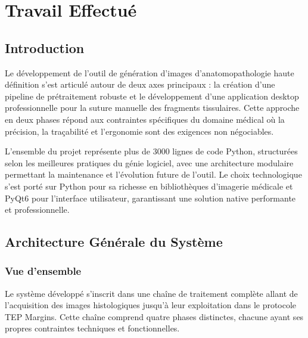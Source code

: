 \documentclass[12pt,a4paper]{report}
\begin{document}
\chapter{Travail Effectué}

\section{Introduction}

Le développement de l'outil de génération d'images d'anatomopathologie haute définition s'est articulé autour de deux axes principaux : la création d'une pipeline de prétraitement robuste et le développement d'une application desktop professionnelle pour la suture manuelle des fragments tissulaires. Cette approche en deux phases répond aux contraintes spécifiques du domaine médical où la précision, la traçabilité et l'ergonomie sont des exigences non négociables.

L'ensemble du projet représente plus de 3000 lignes de code Python, structurées selon les meilleures pratiques du génie logiciel, avec une architecture modulaire permettant la maintenance et l'évolution future de l'outil. Le choix technologique s'est porté sur Python pour sa richesse en bibliothèques d'imagerie médicale et PyQt6 pour l'interface utilisateur, garantissant une solution native performante et professionnelle.

\section{Architecture Générale du Système}

\subsection{Vue d'ensemble}

Le système développé s'inscrit dans une chaîne de traitement complète allant de l'acquisition des images histologiques jusqu'à leur exploitation dans le protocole TEP Margins. Cette chaîne comprend quatre phases distinctes, chacune ayant ses propres contraintes techniques et fonctionnelles.
\end{document}
